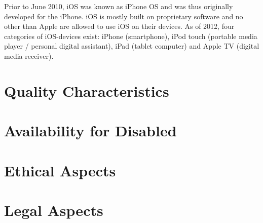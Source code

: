 \documentclass[conference]{IEEEtran}
\begin{document}
Prior to June 2010, iOS was known as iPhone OS and was thus originally developed for the iPhone.  iOS is mostly built on proprietary software and no other than Apple are allowed to use iOS on their devices. As of 2012, four categories of iOS-devices exist: iPhone (smartphone), iPod touch (portable media player / personal digital assistant), iPad (tablet computer) and Apple TV (digital media receiver).

\section{Quality Characteristics}

\section{Availability for Disabled}

\section{Ethical Aspects}

\section{Legal Aspects}
\end{document}
